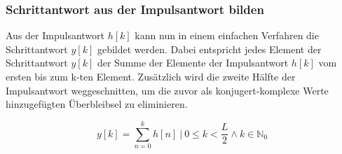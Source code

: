 \subsubsection*{Schrittantwort aus der Impulsantwort bilden}
Aus  der  Impulsantwort $h[k]$  kann  nun  in  einem einfachen  Verfahren  die
Schrittantwort  $y[k]$ gebildet  werden.  Dabei  entspricht jedes  Element der
Schrittantwort  $y[k]$ der  Summe der  Elemente der  Impulsantwort $h[k]$  vom
ersten  bis zum  k-ten Element.   Zus\"atzlich  wird die  zweite H\"alfte  der
Impulsantwort  weggeschnitten,  um  die  zuvor  als  konjugert-komplexe  Werte
hinzugef\"ugten \"Uberbleibsel zu eliminieren.

\begin{equation}
    y[k]= \sum_{n=0}^k h[n] ~\biggr \rvert~ 0 \leq k < \frac{L}{2} \land k \in \mathbb{N}_0
\end{equation}

